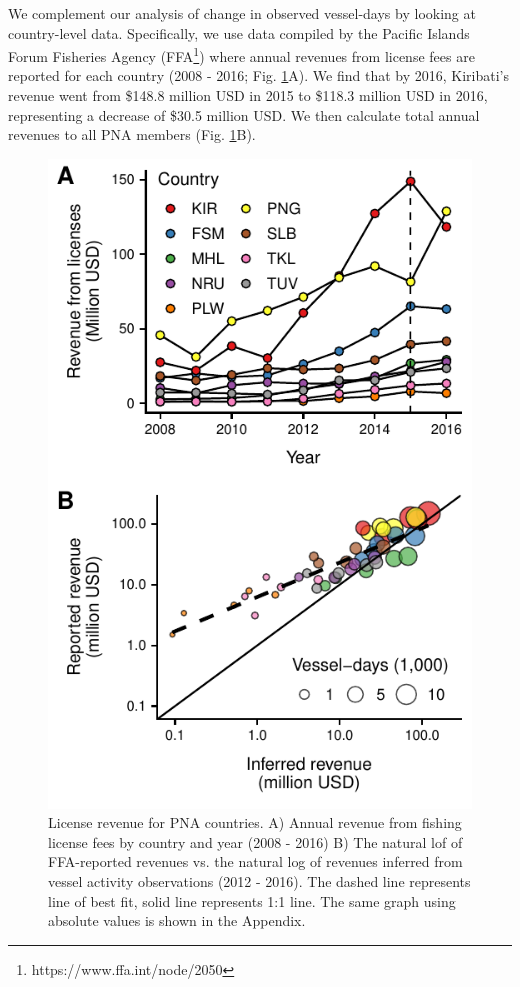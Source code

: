\documentclass[9p,twocolumn,twoside,lineno]{pnas-new}
\begin{document}
We complement our analysis of change in observed vessel-days by looking at country-level data. Specifically, we use data compiled by the Pacific Islands Forum Fisheries Agency (FFA\footnote{https://www.ffa.int/node/2050}) where annual revenues from license fees are reported for each country (2008 - 2016; Fig. \ref{fig:revenues}A). We find that by 2016, Kiribati's revenue went from \$148.8 million USD in 2015 to \$118.3 million USD in 2016, representing a decrease of \$30.5 million USD. We then calculate total annual revenues to all PNA members (Fig. \ref{fig:revenues}B). 

\begin{figure}
\centering
	\includegraphics{img/revenues.pdf}
	\caption{\label{fig:revenues}
		License revenue for PNA countries. A) Annual revenue from fishing license fees by country and year (2008 - 2016) B) The natural lof of FFA-reported revenues vs. the natural log of revenues inferred from vessel activity observations (2012 - 2016). The dashed line represents line of best fit, solid line represents 1:1 line. The same graph using absolute values is shown in the Appendix.}
\end{figure}
\end{document}
